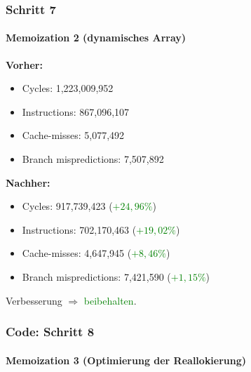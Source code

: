 \documentclass{beamer}
\newcommand{\success}[1]{\textcolor{green}{#1}}
\begin{document}
  \begin{frame}
  	\frametitle{Schritt 7}
  	\framesubtitle{Memoization 2 (dynamisches Array)}
  	\textbf{Vorher:}
		\begin{itemize}
			\item Cycles: 1,223,009,952\\
			\item Instructions: 867,096,107\\
			\item Cache-misses: 5,077,492\\
			\item Branch mispredictions: 7,507,892\\
		\end{itemize}

		\textbf{Nachher:}
		\begin{itemize}
			\item Cycles: 917,739,423 (\success{$+ 24,96\%$})\\
			\item Instructions: 702,170,463 (\success{$+ 19,02\%$})\\
			\item Cache-misses: 4,647,945 (\success{$+ 8,46\%$})\\
			\item Branch mispredictions: 7,421,590 (\success{$+ 1,15\%$})\\
		\end{itemize}
		Verbesserung $\Rightarrow$ \success{beibehalten}.
  \end{frame}
  
	\begin{frame}
  	\frametitle{Code: Schritt 8}
  	\framesubtitle{Memoization 3 (Optimierung der Reallokierung)}
  	\sMemoThree
  \end{frame}
\end{document}
